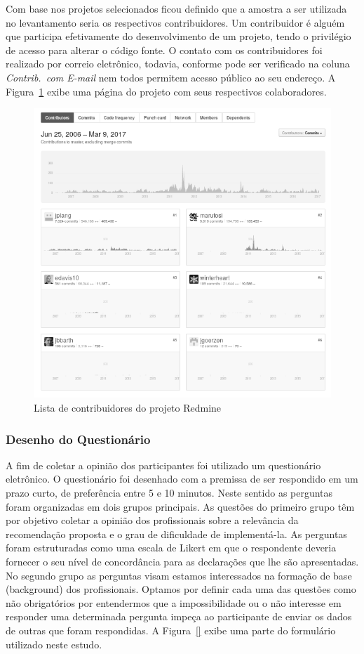 Com base nos projetos selecionados ficou definido que a amostra a ser utilizada
no levantamento seria os respectivos contribuidores. Um contribuidor é alguém
que participa efetivamente do desenvolvimento de um projeto, tendo o privilégio
de acesso para alterar o código fonte. O contato com os contribuidores foi
realizado por correio eletrônico, todavia, conforme pode ser verificado na
coluna \textit{Contrib.\ com E-mail} nem todos permitem acesso público ao seu
endereço. A Figura~\ref{fig:redmine_contribuidores} exibe uma página do projeto
com seus respectivos colaboradores.

\begin{figure}[htpb]
	\centering
	\includegraphics[width=0.8\linewidth]{./chapter-sugestoes-melhorias-fgrm/img/redmine_contribuidores.png}
	\caption{Lista de contribuidores do projeto Redmine}
\label{fig:redmine_contribuidores}
\end{figure}

\subsubsection{Desenho do Questionário}
\label{ssub:sug_melhoria_desenho_questionario}

A fim de coletar a opinião dos participantes foi utilizado um questionário
eletrônico. O questionário foi desenhado com a premissa de ser respondido em um
prazo curto, de preferência entre 5 e 10 minutos. Neste sentido as perguntas
foram organizadas em dois grupos principais.  As questões do primeiro grupo têm
por objetivo coletar a opinião dos profissionais sobre a relevância da
recomendação proposta e o grau de dificuldade de implementá-la. As perguntas
foram estruturadas como uma escala de Likert em que o respondente deveria
fornecer o seu nível de concordância para as declarações que lhe são
apresentadas. No segundo grupo as perguntas visam estamos interessados na
formação de base (background) dos profissionais. Optamos por definir cada uma
das questões como não obrigatórios por entendermos que a impossibilidade ou o
não interesse em responder uma determinada pergunta impeça ao participante de
enviar os dados de outras que foram respondidas. A Figura~\ref{} exibe uma parte
do formulário utilizado neste estudo.

